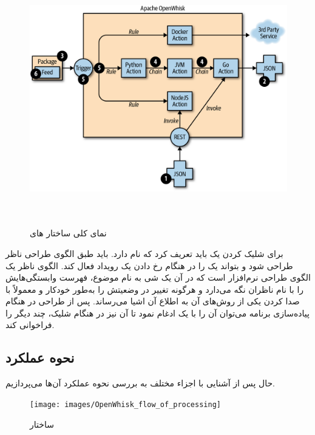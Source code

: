 \begin{figure}[!h]
	\centering
	\includegraphics[height=11cm]{images/OpenWhisk_actions_architecture}
	\caption{نمای کلی ساختار  های }
	\label{تصویر 2-1}
\end{figure}

برای شلیک کردن  یک  باید تعریف کرد که  نام دارد.  باید طبق الگوی طراحی ناظر طراحی شود و بتواند یک  را در هنگام رخ دادن یک رویداد فعال کند. الگوی ناظر یک الگوی طراحی نرم‌افزار است که در آن یک شی به نام موضوع، فهرست وابستگی‌هایش را با نام ناظران نگه می‌دارد و هرگونه تغییر در وضعیتش را به‌طور خودکار و معمولاً با صدا کردن یکی از روش‌های آن به اطلاع آن اشیا می‌رساند. پس از طراحی  در هنگام پیاده‌سازی برنامه می‌توان آن را با یک  ادغام نمود تا آن  نیز در هنگام شلیک، چند  دیگر را فراخوانی کند.

\subsection{نحوه عملکرد }

حال پس از آشنایی با اجزاء مختلف  به بررسی نحوه عملکرد آن‌ها می‌پردازیم.

\begin{figure}[!h]
	\centering
	\texttt{[image: images/OpenWhisk\_flow\_of\_processing]}
	\caption{ساختار }
	\label{تصویر 2-1}
\end{figure}

